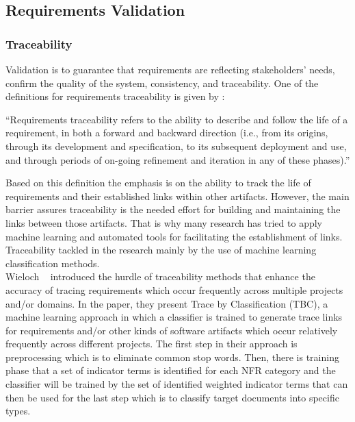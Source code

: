 \subsection{Requirements Validation}

\subsubsection{Traceability}

Validation is to guarantee that requirements are reflecting stakeholders' needs, confirm the quality of the system, consistency, and traceability. 
 One of the definitions for requirements traceability is given by \cite{Gotel:1994}:
\begin{displayquote} 
“Requirements traceability refers to the ability to describe and follow the life of a requirement, in both a forward and backward direction (i.e., from its origins, through its development and specification, to its subsequent deployment and use, and through periods of on-going refinement and iteration in any of these phases).”
\end{displayquote}
Based on this definition the emphasis is on the ability to track the life of requirements and their established links within other artifacts. However, the main barrier assures traceability is the needed effort for building and maintaining the links between those artifacts. That is why many research has tried to apply machine learning and automated tools for facilitating the establishment of links\cite{Gervasi:2011}. 
Traceability tackled in the research mainly by the use of machine learning classification methods.\\

Wieloch \etal~\cite{Wieloch:2013} introduced the hurdle of traceability methods that enhance the accuracy of tracing requirements which occur frequently across multiple projects and/or domains. In the paper, they present Trace by  Classification (TBC),  a machine learning approach in which a classifier is trained to generate trace links for requirements and/or other kinds of software artifacts which occur relatively frequently across different projects. The first step in their approach is preprocessing which is to eliminate common stop words. Then, there is training phase that a set of indicator terms is identified for each NFR category and the classifier will be trained by the set of identified weighted indicator terms that can then be used for the last step which is to classify target documents into specific types.\newline

